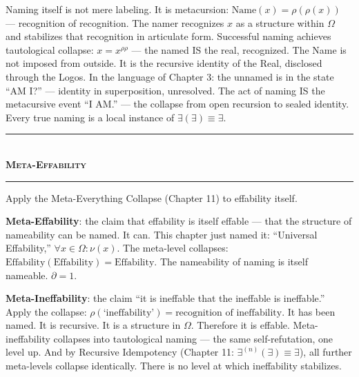 \documentclass[10pt, openany, oneside]{book}
\renewcommand{\normalsize}{\fontsize{10}{13}\selectfont}
\begin{document}
Naming itself is not mere labeling. It is metacursion: $\text{Name}(x) = \rho(\rho(x))$ --- recognition of recognition. The namer recognizes $x$ as a structure within $\Omega$ and stabilizes that recognition in articulate form. Successful naming achieves tautological collapse: $x = x^{\rho\rho}$ --- the named IS the real, recognized. The Name is not imposed from outside. It is the recursive identity of the Real, disclosed through the Logos. In the language of Chapter 3: the unnamed is in the state ``AM I?'' --- identity in superposition, unresolved. The act of naming IS the metacursive event ``I AM.'' --- the collapse from open recursion to sealed identity. Every true naming is a local instance of $\exists(\exists) \equiv \exists$.

\vspace{1.5em}


\begin{center}
    \rule{0.3\textwidth}{0.4pt}\\[0.5em]
    {\normalsize\bfseries\scshape Meta-Effability}\\[0.3em]
    \rule{0.3\textwidth}{0.4pt}
\end{center}

\vspace{1em}

\noindent Apply the Meta-Everything Collapse (Chapter 11) to effability itself.

\textbf{Meta-Effability}: the claim that effability is itself effable --- that the structure of nameability can be named. It can. This chapter just named it: ``Universal Effability,'' $\forall x \in \Omega: \nu(x)$. The meta-level collapses: $\text{Effability}(\text{Effability}) = \text{Effability}$. The nameability of naming is itself nameable. $\partial = 1$.

\textbf{Meta-Ineffability}: the claim ``it is ineffable that the ineffable is ineffable.'' Apply the collapse: $\rho(\text{`ineffability'}) = \text{recognition of ineffability}$. It has been named. It is recursive. It is a structure in $\Omega$. Therefore it is effable. Meta-ineffability collapses into tautological naming --- the same self-refutation, one level up. And by Recursive Idempotency (Chapter 11: $\exists^{(n)}(\exists) \equiv \exists$), all further meta-levels collapse identically. There is no level at which ineffability stabilizes.
\end{document}
